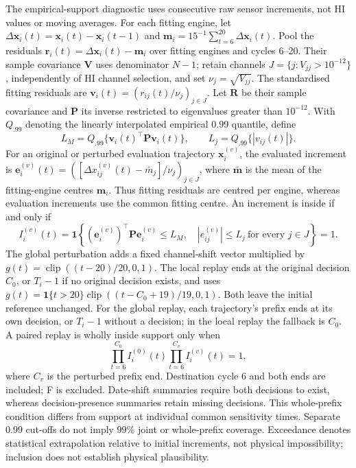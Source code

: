 \documentclass[preprint,12pt]{elsarticle}
\begin{document}
The empirical-support diagnostic uses consecutive raw sensor increments, not HI values or moving averages. For each fitting engine, let $\Delta\mathbf x_i(t)=\mathbf x_i(t)-\mathbf x_i(t-1)$ and $\mathbf m_i=15^{-1}\sum_{t=6}^{20}\Delta\mathbf x_i(t)$. Pool the residuals $\mathbf r_i(t)=\Delta\mathbf x_i(t)-\mathbf m_i$ over fitting engines and cycles 6--20. Their sample covariance $\mathbf V$ uses denominator $N-1$; retain channels $J=\{j:V_{jj}>10^{-12}\}$, independently of HI channel selection, and set $\nu_j=\sqrt{V_{jj}}$. The standardised fitting residuals are $\mathbf v_i(t)=(r_{ij}(t)/\nu_j)_{j\in J}$. Let $\mathbf R$ be their sample covariance and $\mathbf P$ its inverse restricted to eigenvalues greater than $10^{-12}$. With $Q_{.99}$ denoting the linearly interpolated empirical 0.99 quantile, define
\[
 L_M=Q_{.99}\{\mathbf v_i(t)^\top\mathbf P\mathbf v_i(t)\},
 \qquad L_j=Q_{.99}\{|v_{ij}(t)|\}.
\]
For an original or perturbed evaluation trajectory $\mathbf x_i^{(v)}$, the evaluated increment is $\mathbf e_i^{(v)}(t)=([\Delta x_{ij}^{(v)}(t)-\bar m_j]/\nu_j)_{j\in J}$, where $\bar{\mathbf m}$ is the mean of the fitting-engine centres $\mathbf m_i$. Thus fitting residuals are centred per engine, whereas evaluation increments use the common fitting centre. An increment is inside if and only if
\[
 I_i^{(v)}(t)=\mathbf1\!\left\{
 (\mathbf e_i^{(v)})^\top\mathbf P\mathbf e_i^{(v)}\leq L_M,
 \quad |e_{ij}^{(v)}|\leq L_j\ \text{for every }j\in J\right\}=1.
\]
The global perturbation adds a fixed channel-shift vector multiplied by $g(t)=\operatorname{clip}((t-20)/20,0,1)$. The local replay ends at the original decision $C_0$, or $T_i-1$ if no original decision exists, and uses $g(t)=\mathbf1\{t>20\}\operatorname{clip}((t-C_0+19)/19,0,1)$. Both leave the initial reference unchanged. For the global replay, each trajectory's prefix ends at its own decision, or $T_i-1$ without a decision; in the local replay the fallback is $C_0$. A paired replay is wholly inside support only when
\[
 \prod_{t=6}^{C_0} I_i^{(0)}(t)
 \prod_{t=6}^{C_v} I_i^{(v)}(t)=1,
\]
where $C_v$ is the perturbed prefix end. Destination cycle 6 and both ends are included; F is excluded. Date-shift summaries require both decisions to exist, whereas decision-presence summaries retain missing decisions. This whole-prefix condition differs from support at individual common sensitivity times. Separate 0.99 cut-offs do not imply 99\% joint or whole-prefix coverage. Exceedance denotes statistical extrapolation relative to initial increments, not physical impossibility; inclusion does not establish physical plausibility.
\end{document}
